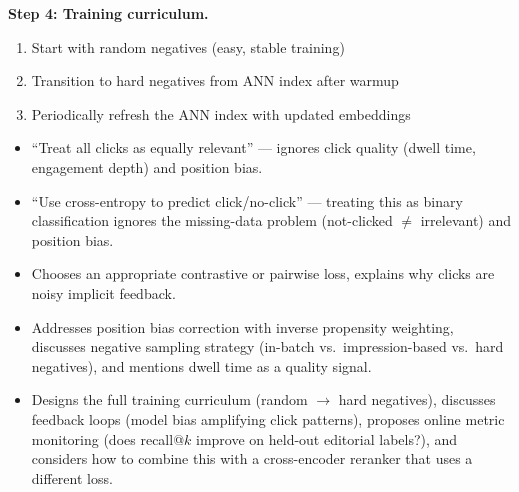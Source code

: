 \begin{interviewq}
\textbf{Step 4: Training curriculum.}
\begin{enumerate}
    \item Start with random negatives (easy, stable training)
    \item Transition to hard negatives from ANN index after warmup
    \item Periodically refresh the ANN index with updated embeddings
\end{enumerate}

\redflags
\begin{itemize}
    \item ``Treat all clicks as equally relevant'' --- ignores click quality (dwell time, engagement depth) and position bias.
    \item ``Use cross-entropy to predict click/no-click'' --- treating this as binary classification ignores the missing-data problem (not-clicked $\neq$ irrelevant) and position bias.
\end{itemize}


\goodgreat
\begin{itemize}
    \item {} Chooses an appropriate contrastive or pairwise loss, explains why clicks are noisy implicit feedback.
    \item {} Addresses position bias correction with inverse propensity weighting, discusses negative sampling strategy (in-batch vs.\ impression-based vs.\ hard negatives), and mentions dwell time as a quality signal.
    \item {} Designs the full training curriculum (random $\to$ hard negatives), discusses feedback loops (model bias amplifying click patterns), proposes online metric monitoring (does recall@$k$ improve on held-out editorial labels?), and considers how to combine this with a cross-encoder reranker that uses a different loss.
\end{itemize}

\end{interviewq}

